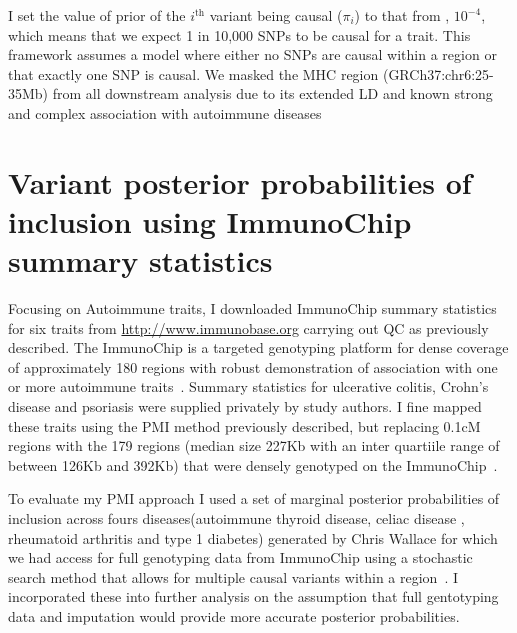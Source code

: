 \documentclass[a4paper,11pt]{report}
\begin{document}
I set the value of prior of the $i^\text{th}$ variant being causal ($\pi_{i}$) to that from \citet{GiambartolomeiVukcevicSchadtEtAl2014}, $10^{-4}$, which means that we expect 1 in 10,000 SNPs to be causal for a trait. This framework assumes a model where either no SNPs are causal within a region or that exactly one SNP is causal. We masked the MHC region (GRCh37:chr6:25-35Mb) from all downstream analysis due to its extended LD and known strong and complex association with autoimmune diseases

\section{Variant posterior probabilities of inclusion using ImmunoChip summary statistics}

Focusing on Autoimmune traits,  I downloaded  ImmunoChip summary statistics for six traits from \url{http://www.immunobase.org} carrying out QC as previously described. The ImmunoChip is a targeted genotyping platform for dense coverage of approximately 180 regions with robust demonstration of association with one or more autoimmune traits~\citep{CortesBrown2011}. Summary statistics for ulcerative colitis, Crohn's disease and psoriasis were supplied privately by study authors. I fine mapped these traits using the PMI method previously described, but replacing 0.1cM regions with the 179 regions (median size 227Kb with an inter quartiile range of between 126Kb and 392Kb) that were densely genotyped on the ImmunoChip~\citep{Onengut-Gumuscu2015-lb}. 

To evaluate my PMI approach I used a set of marginal posterior probabilities of inclusion across fours diseases(autoimmune thyroid disease, celiac disease , rheumatoid arthritis and type 1 diabetes)  generated by Chris Wallace for which we had access for full genotyping data from ImmunoChip using a stochastic search method that allows for multiple causal variants within a region~\citep{WallaceCutlerPontikosEtAl2015}. I incorporated these into further analysis on the assumption that full gentotyping data and imputation would provide more accurate posterior probabilities.


\end{document}
